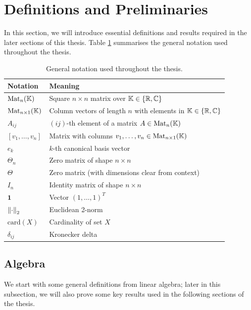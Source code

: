 \section{Definitions and Preliminaries}\label{sec:one}
In this section, we will introduce essential definitions and results required in the later sections of this thesis. Table \ref{tab:notation_general} summarises the general notation used throughout the thesis. 

\begin{table}[H]
    \centering
    \caption{General notation used throughout the thesis.}
    \label{tab:notation_general}
    \begin{tabular}{ll}
        \toprule
        \textbf{Notation} & \textbf{Meaning} \\
        \midrule
        $\text{Mat}_n(\mathbb{K})$ & Square $n\times n$ matrix over $\mathbb{K}\in\{\mathbb{R},\mathbb{C}\}$ \\
        $\text{Mat}_{n\times 1}(\mathbb{K})$ & Column vectors of length $n$ with elements in $\mathbb{K}\in\{\mathbb{R},\mathbb{C}\}$\\
        $A_{ij}$ & $(ij)$-th element of a matrix $A\in\text{Mat}_n(\mathbb{K})$ \\
        $[v_1,\dots,v_n]$ & Matrix with columns $v_1,\dots, v_n\in\text{Mat}_{n\times 1}(\mathbb{K})$ \\
        $e_k$ & $k$-th canonical basis vector \\
        $\Theta_n$ & Zero matrix of shape $n\times n$ \\
        $\Theta$ & Zero matrix (with dimensions clear from context)  \\
        $I_n$ & Identity matrix of shape $n\times n$ \\
        $\mathbf{1}$ & Vector $(1,\dots,1)^T$ \\
        $\left\lVert\cdot\right\rVert_2$ & Euclidean 2-norm \\
        $\text{card}(X)$ & Cardinality of set $X$ \\
        $\delta_{ij}$ & Kronecker delta \\
        \bottomrule
    \end{tabular}
\end{table}

\subsection{Algebra}
We start with some general definitions from linear algebra; later in this subsection, we will also prove some key results used in the following sections of the thesis.

